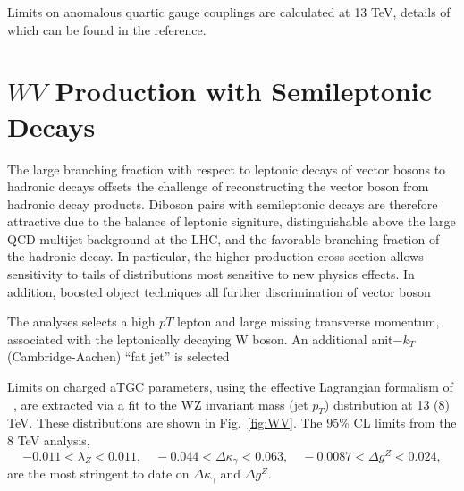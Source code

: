 \documentclass[10pt]{article}
\begin{document}
Limits on anomalous quartic gauge couplings are calculated at 13 TeV, 
details of which can be found in the reference.

\section{$WV$ Production with Semileptonic Decays}

The large branching fraction with respect to leptonic decays 
of vector bosons to hadronic decays offsets
the challenge of reconstructing the vector boson from
hadronic decay products. Diboson pairs with semileptonic decays
are therefore attractive due to the balance of leptonic signiture, 
distinguishable above the large QCD multijet background at the LHC,
and the favorable branching fraction of the hadronic decay.
In particular, the higher production cross section
allows sensitivity to tails of distributions most sensitive to new physics
effects. 
In addition, boosted object techniques all further discrimination of
vector boson

The analyses selects a high $p{T}$ lepton and large missing transverse momentum, 
associated with the leptonically decaying W boson. An additional anit$-k_{T}$
(Cambridge-Aachen) ``fat jet'' is selected


Limits on charged aTGC parameters, using the effective Lagrangian formalism of ~\cite{Hagiwara:1993ck},
are extracted via a fit to the WZ invariant mass (jet $p_{T}$) distribution at 13 (8) TeV.
These distributions are shown in Fig.~\ref{fig:WV}.
The 95\% CL limits from the 8 TeV analysis,
\begin{equation}
  -0.011 < \lambda_{Z} < 0.011, \quad -0.044 < \Delta\kappa_{\gamma} < 0.063, \quad -0.0087 < \Delta g^{Z} < 0.024,
\end{equation}
are the most stringent to date on $\Delta\kappa_\gamma$ and $\Delta g^{Z}$.

\cite{CMS:2017ruh}
\cite{Sirunyan:2017bey}
\end{document}
